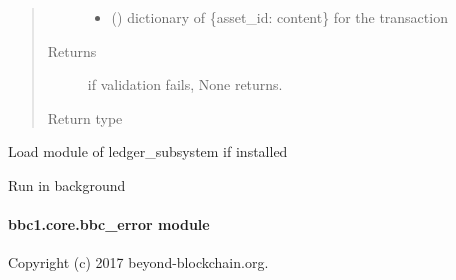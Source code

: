 \documentclass[letterpaper,10pt,english]{sphinxmanual}
\begin{document}
\begin{fulllineitems}
\begin{fulllineitems}
\begin{quote}
\begin{description}
\begin{itemize}
\item {} 
 () \textendash{} dictionary of \{asset\_id: content\} for the transaction

\end{itemize}

\item[{Returns}] \leavevmode
if validation fails, None returns.

\item[{Return type}] \leavevmode
{\hyperref[\detokenize{bbc1.core.bbclib:bbc1.core.bbclib.BBcTransaction}]{}}

\end{description}\end{quote}

\end{fulllineitems}


\end{fulllineitems}


\begin{fulllineitems}
\label{\detokenize{bbc1.core.bbc_core:bbc1.core.bbc_core.activate_ledgersubsystem}}
Load module of ledger\_subsystem if installed

\end{fulllineitems}


\begin{fulllineitems}
\label{\detokenize{bbc1.core.bbc_core:bbc1.core.bbc_core.daemonize}}
Run in background

\end{fulllineitems}



\paragraph{bbc1.core.bbc\_error module}
\label{\detokenize{bbc1.core.bbc_error:bbc1-core-bbc-error-module}}\label{\detokenize{bbc1.core.bbc_error:module-bbc1.core.bbc_error}}\label{\detokenize{bbc1.core.bbc_error::doc}}
Copyright (c) 2017 beyond-blockchain.org.
\end{document}
